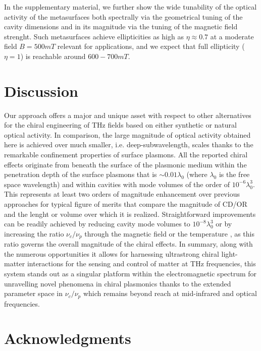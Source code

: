 \documentclass[twocolumn]{article}
\begin{document}
\noindent In the supplementary material, we further show the wide tunability of the optical activity of the metasurfaces both spectrally via the geometrical tuning of the cavity dimensions and in its magnitude via the tuning of the magnetic field strenght. Such metasurfaces achieve ellipticities as high as $\eta \approx 0.7$ at a moderate field $B=500mT$ relevant for applications, and we expect that full ellipticity ($\eta=1$) is reachable around $600-700mT$. 

\section*{Discussion}
Our approach offers a major and unique asset with respect to other alternatives for the chiral engineering of THz fields based on either synthetic \cite{Zhang_2012,Kan_2015,Kim_2017,Cong_2019} or natural \cite{Wang_2009,Mu_2019,Ju_2023} optical activity. In comparison, the large magnitude of optical activity obtained here is achieved over much smaller, i.e. deep-subwavelength, scales thanks to the remarkable confinement properties of surface plasmons. All the reported chiral effects originate from beneath the surface of the plasmonic medium within the penetration depth of the surface plasmons that is $\sim 0.01 \lambda_0$ (where $\lambda_0$ is the free space wavelength) and within cavities with mode volumes of the order of $10^{-6} \lambda_0^3$. This represents at least two orders of magnitude enhancement over previous approaches for typical figure of merits that compare the magnitude of CD/OR and the lenght or volume over which it is realized. Straightforward improvements can be readily achieved by reducing cavity mode volumes to $10^{-8} \lambda_0^3$ \cite{Aupiais_2023} or by increasing the ratio $\nu_c/\nu_p$ through the magnetic field or the temperature \cite{Aupiais_2023}, as this ratio governs the overall magnitude of the chiral effects. In summary, along with the numerous opportunities it allows for harnessing ultrastrong chiral light-matter interactions for the sensing and control of matter at THz frequencies, this system stands out as a singular platform within the electromagnetic spectrum for unravelling novel phenomena in chiral plasmonics thanks to the extended parameter space in $\nu_c/\nu_p$ which remains beyond reach at mid-infrared and optical frequencies.

\section*{Acknowledgments}
\end{document}
